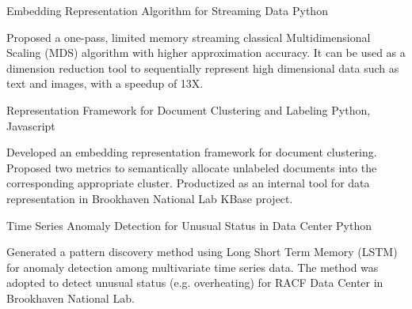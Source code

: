 


\begin{cventries}


\projentry
{Embedding Representation Algorithm for Streaming Data} %
{Python} %
{ 
\begin{cvitems}
\item{Proposed a one-pass, limited memory streaming classical Multidimensional Scaling ({MDS}) algorithm with higher approximation accuracy. It can be used as a dimension reduction tool to sequentially represent high dimensional data such as text and images, with a speedup of 13X.}
\end{cvitems}
}


\projentry
{Representation Framework for Document Clustering and Labeling} %
{Python, Javascript} %
{ 
\begin{cvitems}
\item{Developed an embedding representation framework for document clustering. Proposed two metrics to semantically allocate unlabeled documents into the corresponding appropriate cluster. Productized as an internal tool for data representation in Brookhaven National Lab KBase project.}
\end{cvitems}
}


\projentry
{Time Series Anomaly Detection for Unusual Status in Data Center} %
{Python} %
{ %
\begin{cvitems}
\item{Generated a pattern discovery method using Long Short Term Memory ({LSTM}) for anomaly detection among multivariate time series data. The method was adopted to detect unusual status (e.g. overheating) for RACF Data Center in Brookhaven National Lab.}
\end{cvitems}
}


\end{cventries}

